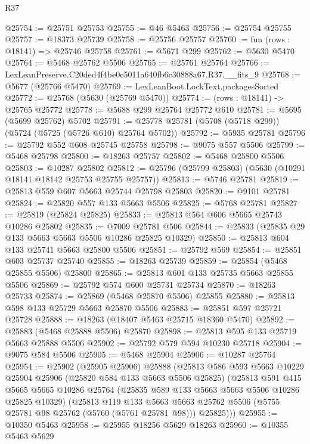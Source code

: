 \begin{lexlean}{R37}
\begin{coremodule}
@25754 := @25751 @25753
@25755 := @46 @5463
@25756 := @25754 @25755
@25757 := @18373 @25739
@25758 := @25756 @25757
@25760 := fun (rows : @18141) => @25746 @25758
@25761 := @5671 @299
@25762 := @5630 @5470
@25764 := @5468 @25762 @5506
@25765 := @25761 @25764
@25766 := LexLeanPreserve.C20ded4f4be0e5011a640fb6c30888a67.R37.__fits_9
@25768 := @5677 (@25766 @5470)
@25769 := LexLeanBoot.LockText.packagesSorted
@25772 := @25768 (@5630 (@25769 @5470))
@25774 := (rows : @18141) -> @25765 @25772
@25778 := @5688 @299 @25764 @25772 @610
@25781 := @5695 (@5699 @25762) @5702
@25791 := @25778 @25781 (@5708 (@5718 @299)) (@5724 (@5725 (@5726 @610) @25764 @5702))
@25792 := @5935 @25781
@25796 := @25792 @552 @608 @25745 @25758
@25798 := @9075 @557 @5506
@25799 := @5468 @25798
@25800 := @18263 @25757
@25802 := @5468 @25800 @5506
@25803 := @10287 @25802
@25812 := @25796 (@25799 @25803) (@5630 (@10291 @18141 @18142 @25753 @25755 @25757))
@25813 := @5746 @25781
@25819 := @25813 @559 @607 @5663 @25744 @25798 @25803
@25820 := @9101 @25781
@25824 := @25820 @557 @133 @5663 @5506
@25825 := @5768 @25781
@25827 := @25819 (@25824 @25825)
@25833 := @25813 @564 @606 @5665 @25743 @10286 @25802
@25835 := @7009 @25781 @506
@25844 := @25833 (@25835 @29 @133 @5663 @5663 @5506 @10286 @25825 @10329)
@25850 := @25813 @604 @133 @25741 @5663 @25800 @5506
@25851 := @25792 @569
@25854 := @25851 @603 @25737 @25740
@25855 := @18263 @25739
@25859 := @25854 (@5468 @25855 @5506) @25800
@25865 := @25813 @601 @133 @25735 @5663 @25855 @5506
@25869 := @25792 @574 @600 @25731 @25734
@25870 := @18263 @25733
@25874 := @25869 (@5468 @25870 @5506) @25855
@25880 := @25813 @598 @133 @25729 @5663 @25870 @5506
@25883 := @25851 @597 @25721 @25728
@25888 := @18263 (@18407 @5463 @25715 @18360 @5470)
@25892 := @25883 (@5468 @25888 @5506) @25870
@25898 := @25813 @595 @133 @25719 @5663 @25888 @5506
@25902 := @25792 @579 @594 @10230 @25718
@25904 := @9075 @584 @5506
@25905 := @5468 @25904
@25906 := @10287 @25764
@25954 := @25902
    (@25905 @25906)
    @25888
    (@25813
      @586
      @593
      @5663
      @10229
      @25904
      @25906
      (@25820 @584 @133 @5663 @5506 @25825)
      (@25813
        @591
        @415
        @5665
        @5665
        @10286
        @25764
        (@25835 @589 @133 @5663 @5663 @5506 @10286 @25825 @10329)
        (@25813
          @119
          @133
          @5663
          @5663
          @25762
          @5506
          (@5755 @25781 @98 @25762 (@5760 (@5761 @25781 @98)))
          @25825)))
@25955 := @10350 @5463
@25958 := @25955 @18256 @5629 @18263
@25960 := @10355 @5463 @5629

\end{coremodule}
\end{lexlean}
